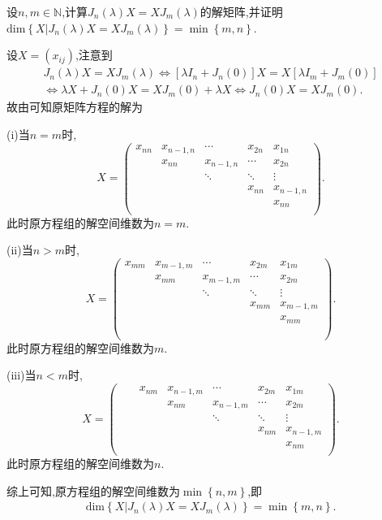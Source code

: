 \documentclass[../../main.tex]{subfiles}%
\begin{document}
\begin{corollary}\label{corollary:与Jordan块J_n(lambda)可交换的矩阵}
设$n,m\in\mathbb{N}$,计算$J_n(\lambda)X = XJ_m(\lambda)$的解矩阵,并证明$\mathrm{dim}\left\{ X|J_n\left( \lambda \right) X=XJ_m\left( \lambda \right) \right\} =\min \left\{ m,n \right\}.$
\end{corollary}
\begin{solution}

设$X=(x_{ij})$,注意到
\begin{gather*}
J_n\left( \lambda \right) X=XJ_m\left( \lambda \right) \Longleftrightarrow \left[ \lambda I_n+J_n\left( 0 \right) \right] X=X\left[ \lambda I_m+J_m\left( 0 \right) \right] 
\\
\Longleftrightarrow \lambda X+J_n\left( 0 \right) X=XJ_m\left( 0 \right) +\lambda X\Longleftrightarrow J_n\left( 0 \right) X=XJ_m\left( 0 \right) .
\end{gather*}
故由可知原矩阵方程的解为

(i)当$n=m$时,
\[
X=\left( \begin{matrix}
x_{nn}&		x_{n-1,n}&		\cdots&		x_{2n}&		x_{1n}\\
&		x_{nn}&		x_{n-1,n}&		\cdots&		x_{2n}\\
&		&		\ddots&		\ddots&		\vdots\\
&		&		&		x_{nn}&		x_{n-1,n}\\
&		&		&		&		x_{nn}\\
\end{matrix} \right) .
\] 
此时原方程组的解空间维数为$n=m$.

(ii)当$n>m$时,
\[
X=\left( \begin{matrix}
x_{mm}&		x_{m-1,m}&		\cdots&		x_{2m}&		x_{1m}\\
&		x_{mm}&		x_{m-1,m}&		\cdots&		x_{2m}\\
&		&		\ddots&		\ddots&		\vdots\\
&		&		&		x_{mm}&		x_{m-1,m}\\
&		&		&		&		x_{mm}\\
&		&		&		&		\\
&		&		&		&		\\
\end{matrix} \right) .
\] 
此时原方程组的解空间维数为$m$.

(iii)当$n<m$时,
\[
X=\left( \begin{matrix}
	&		&		x_{nm}&		x_{n-1,m}&		\cdots&		x_{2m}&		x_{1m}\\
	&		&		&		x_{nm}&		x_{n-1,m}&		\cdots&		x_{2m}\\
	&		&		&		&		\ddots&		\ddots&		\vdots\\
	&		&		&		&		&		x_{nm}&		x_{n-1,m}\\
	&		&		&		&		&		&		x_{nm}\\
\end{matrix} \right) .
\] 
此时原方程组的解空间维数为$n $.

综上可知,原方程组的解空间维数为$\min \left\{ n,m \right\} $,即
\begin{align*}
\mathrm{dim}\left\{ X|J_n\left( \lambda \right) X=XJ_m\left( \lambda \right) \right\} =\min \left\{ m,n \right\}.
\end{align*}

\end{solution}
\end{document}

